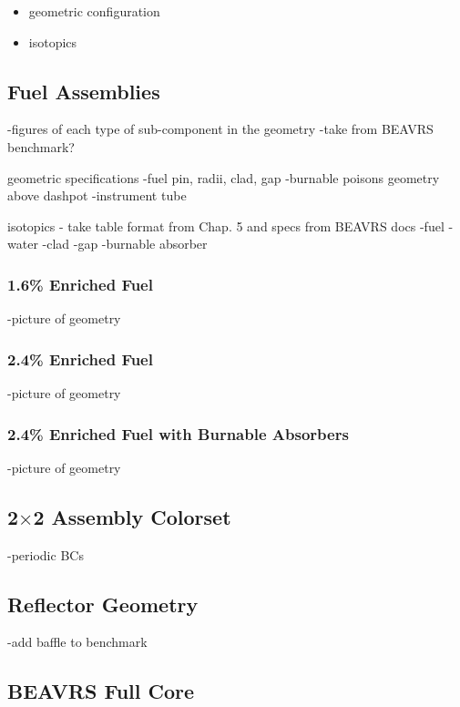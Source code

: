 \begin{itemize}[noitemsep]
  \item geometric configuration
  \item isotopics
\end{itemize}

\subsection{Fuel Assemblies}

-figures of each type of sub-component in the geometry
-take from BEAVRS benchmark?

geometric specifications
-fuel pin, radii, clad, gap
-burnable poisons geometry above dashpot
-instrument tube

isotopics - take table format from Chap. 5 and specs from BEAVRS docs
-fuel
-water
-clad
-gap
-burnable absorber

\subsubsection{1.6\% Enriched Fuel}

-picture of geometry

\subsubsection{2.4\% Enriched Fuel}

-picture of geometry

\subsubsection{2.4\% Enriched Fuel with Burnable Absorbers}

-picture of geometry

\subsection{2$\times$2 Assembly Colorset}

-periodic BCs

\subsection{Reflector Geometry}

-add baffle to benchmark

\subsection{BEAVRS Full Core}


